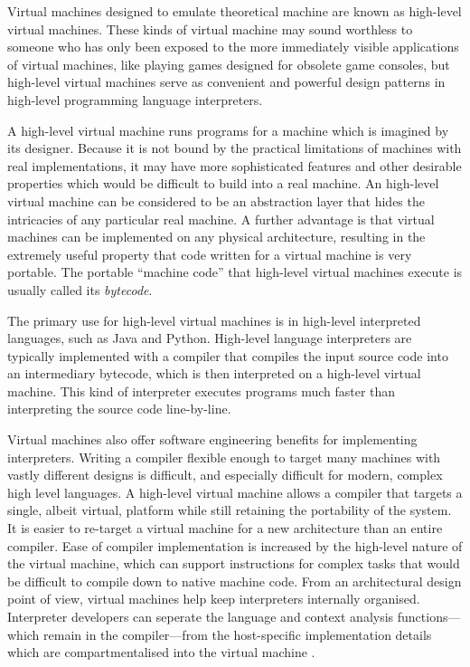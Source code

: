 		Virtual machines designed to emulate theoretical machine are known as high-level virtual machines. These kinds of virtual machine may sound worthless to someone who has only been exposed to the more immediately visible applications of virtual machines, like playing games designed for obsolete game consoles, but high-level virtual machines serve as convenient and powerful design patterns in high-level programming language interpreters.
		
		A high-level virtual machine runs programs for a machine which is imagined by its designer. Because it is not bound by the practical limitations of machines with real implementations, it may have more sophisticated features and other desirable properties which would be difficult to build into a real machine. An high-level virtual machine can be considered to be an abstraction layer that hides the intricacies of any particular real machine. A further advantage is that virtual machines can be implemented on any physical architecture, resulting in the extremely useful property that code written for a virtual machine is very portable. The portable ``machine code'' that high-level virtual machines execute is usually called its \emph{bytecode}. 
		
		The primary use for high-level virtual machines is in high-level interpreted languages, such as Java and Python. High-level language interpreters are typically implemented with a compiler that compiles the input source code into an intermediary bytecode, which is then interpreted on a high-level virtual machine. This kind of interpreter executes programs much faster than interpreting the source code line-by-line.
		
		Virtual machines also offer software engineering benefits for implementing interpreters. Writing a compiler flexible enough to target many machines with vastly different designs is difficult, and especially difficult for modern, complex high level languages. A high-level virtual machine allows a compiler that targets a single, albeit virtual, platform while still retaining the portability of the system. It is easier to re-target a virtual machine for a new architecture than an entire compiler. Ease of compiler implementation is increased by the high-level nature of the virtual machine, which can support instructions for complex tasks that would be difficult to compile down to native machine code. From an architectural design point of view, virtual machines help keep interpreters internally organised. Interpreter developers can seperate the language and context analysis functions---which remain in the compiler---from the host-specific implementation details which are compartmentalised into the virtual machine \citep{structureinterpreters}.
		
